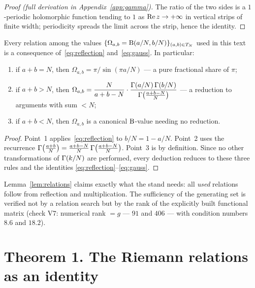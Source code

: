 \begin{proof}[Proof (full derivation in Appendix~\ref{app:gamma})]
The ratio of the two sides is a $1$-periodic holomorphic function
tending to $1$ as $\operatorname{Re} z\to+\infty$ in vertical strips of finite
width; periodicity spreads the limit across the strip, hence the
identity.
\end{proof}

\begin{lemma}\label{lem:relations}
Every relation among the values
$\{\Omega_{a,b}=\mathrm{B}(a/N,b/N)\}_{(a,b)\in T_N}$ used in this text is
a consequence of~\eqref{eq:reflection} and~\eqref{eq:gauss}. In
particular:
\begin{enumerate}[leftmargin=2em, itemsep=0.15em]
\item if $a+b=N$, then $\Omega_{a,b}=\pi/\sin(\pi a/N)$ --- a pure
  fractional share of $\pi$;
\item if $a+b>N$, then
  $\Omega_{a,b}=\dfrac{N}{a+b-N}\cdot
  \dfrac{\Gamma(a/N)\,\Gamma(b/N)}{\Gamma\bigl(\frac{a+b-N}{N}\bigr)}$ ---
  a reduction to arguments with sum $<N$;
\item if $a+b<N$, then $\Omega_{a,b}$ is a canonical $\mathrm{B}$-value
  needing no reduction.
\end{enumerate}
\end{lemma}

\begin{proof}
Point~1 applies~\eqref{eq:reflection} to $b/N=1-a/N$. Point~2 uses
the recurrence
$\Gamma\bigl(\frac{a+b}{N}\bigr)=\frac{a+b-N}{N}\,
\Gamma\bigl(\frac{a+b-N}{N}\bigr)$. Point~3 is by definition. Since no
other transformations of $\Gamma(k/N)$ are performed, every deduction
reduces to these three rules and the identities
\eqref{eq:reflection}--\eqref{eq:gauss}.
\end{proof}

\begin{statusbox}
Lemma~\ref{lem:relations} claims exactly what the stand needs: all
\emph{used} relations follow from reflection and multiplication. The
sufficiency of the generating set is verified not by a relation
search but by the rank of the explicitly built functional matrix
(check V7: numerical rank $=g$ --- $91$ and $406$ --- with condition
numbers $8.6$ and $18.2$).
\end{statusbox}

\section{Theorem 1. The Riemann relations as an identity}
\label{sec:riemann}

